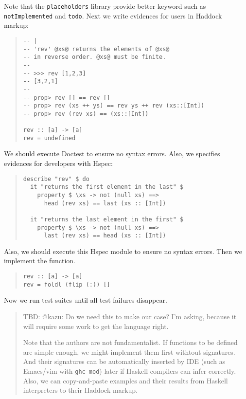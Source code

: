 \documentclass[preprint]{sigplanconf}
\begin{document}
\noindent Note that the {\tt placeholders} library provide better keyword such as {\tt notImplemented} and {\tt todo}.
Next we write evidences for users in Haddock markup:

\begin{quote}
\small
\begin{verbatim}
-- |
-- 'rev' @xs@ returns the elements of @xs@
-- in reverse order. @xs@ must be finite.
--
-- >>> rev [1,2,3]
-- [3,2,1]
--
-- prop> rev [] == rev []
-- prop> rev (xs ++ ys) == rev ys ++ rev (xs::[Int])
-- prop> rev (rev xs) == (xs::[Int])

rev :: [a] -> [a]
rev = undefined
\end{verbatim}
\end{quote}

\noindent We should execute Doctest to ensure no syntax errors.
Also, we specifies evidences for developers with Hspec:

\begin{quote}
\small
\begin{verbatim}
describe "rev" $ do
  it "returns the first element in the last" $
    property $ \xs -> not (null xs) ==>
      head (rev xs) == last (xs :: [Int])

  it "returns the last element in the first" $
    property $ \xs -> not (null xs) ==>
      last (rev xs) == head (xs :: [Int])
\end{verbatim}
\end{quote}

\noindent Also, we should execute this Hspec module
to ensure no syntax errors.
Then we implement the function.

\begin{quote}
\small
\begin{verbatim}
rev :: [a] -> [a]
rev = foldl (flip (:)) []
\end{verbatim}
\end{quote}

\noindent Now we run test suites until
all test failures disappear.

\begin{quote}
    TBD: @kazu: Do we need this to make our case?  I'm asking, because
    it will require some work to get the language right.

    Note that the authors are not fundamentalist.  If functions to be
    defined are simple enough, we might implement them first withtout
    signatures.  And their signatures can be automatically inserted by
    IDE (such as Emacs/vim with {\tt ghc-mod}) later if Haskell
    compilers can infer correctly.  Also, we can copy-and-paste
    examples and their results from Haskell interpreters to their
    Haddock markup.
\end{quote}
\end{document}
